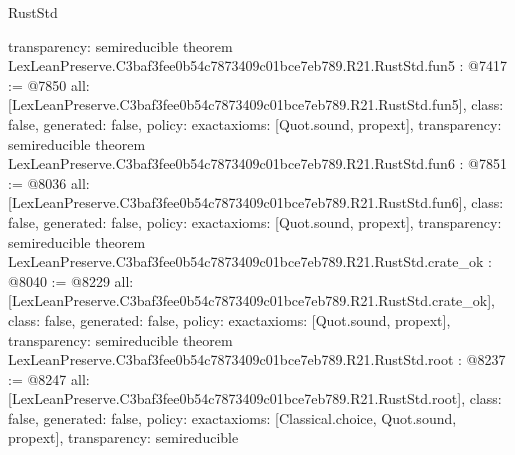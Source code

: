 \begin{lexlean}{RustStd}
\begin{coremodule}
{  transparency: semireducible
}
theorem LexLeanPreserve.C3baf3fee0b54c7873409c01bce7eb789.R21.RustStd.fun5 : @7417 := @7850 {
  all: [LexLeanPreserve.C3baf3fee0b54c7873409c01bce7eb789.R21.RustStd.fun5],
  class: false,
  generated: false,
  policy: exact{axioms: [Quot.sound, propext]},
  transparency: semireducible
}
theorem LexLeanPreserve.C3baf3fee0b54c7873409c01bce7eb789.R21.RustStd.fun6 : @7851 := @8036 {
  all: [LexLeanPreserve.C3baf3fee0b54c7873409c01bce7eb789.R21.RustStd.fun6],
  class: false,
  generated: false,
  policy: exact{axioms: [Quot.sound, propext]},
  transparency: semireducible
}
theorem LexLeanPreserve.C3baf3fee0b54c7873409c01bce7eb789.R21.RustStd.crate_ok : @8040 := @8229 {
  all: [LexLeanPreserve.C3baf3fee0b54c7873409c01bce7eb789.R21.RustStd.crate_ok],
  class: false,
  generated: false,
  policy: exact{axioms: [Quot.sound, propext]},
  transparency: semireducible
}
theorem LexLeanPreserve.C3baf3fee0b54c7873409c01bce7eb789.R21.RustStd.root : @8237 := @8247 {
  all: [LexLeanPreserve.C3baf3fee0b54c7873409c01bce7eb789.R21.RustStd.root],
  class: false,
  generated: false,
  policy: exact{axioms: [Classical.choice, Quot.sound, propext]},
  transparency: semireducible
}


\end{coremodule}
\end{lexlean}

